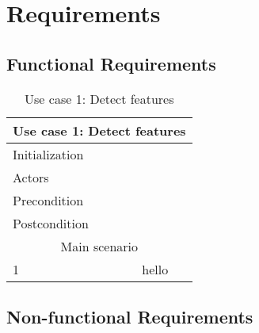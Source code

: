 \section{Requirements}

\subsection{Functional Requirements}

\begin{table}[htbp]
\begin{tabularx}{1\textwidth}{l X} 
    \toprule
    \multicolumn{2}{c}{\textbf{Use case 1: Detect features}}\\
    \midrule
    Initialization & \\
    Actors & \\
    Precondition & \\
    Postcondition & \\
    
    \midrule
    \multicolumn{2}{c}{Main scenario}\\
    1 & hello \\
    
    \bottomrule
\end{tabularx}
    \caption{Use case 1: Detect features}
    \label{tab:ucDetectFeatures}
\end{table}

\subsection{Non-functional Requirements}

